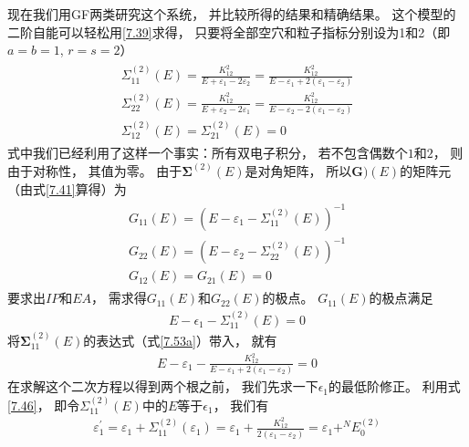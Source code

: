 现在我们用GF两类研究这个系统，
并比较所得的结果和精确结果。
这个模型的二阶自能可以轻松用\eqref{7.39}求得，
只要将全部空穴和粒子指标分别设为1和2（即$a=b=1$, 
$r=s=2$）
\begin{subequations}
    \begin{align}\begin{array}{l}
    \Sigma_{11}^{(2)}(E)=\frac{K_{12}^{2}}{E+\varepsilon_{1}-2 \varepsilon_{2}}=\frac{K_{12}^{2}}{E-\varepsilon_{1}+2\left(\varepsilon_{1}-\varepsilon_{2}\right)} \label{7.53a}\\
    \Sigma_{22}^{(2)}(E)=\frac{K_{12}^{2}}{E+\varepsilon_{2}-2 \varepsilon_{1}}=\frac{K_{12}^{2}}{E-\varepsilon_{2}-2\left(\varepsilon_{1}-\varepsilon_{2}\right)} \\
    \Sigma_{12}^{(2)}(E)=\Sigma_{21}^{(2)}(E)=0
    \end{array}\end{align}
\end{subequations}
式中我们已经利用了这样一个事实：所有双电子积分，
若不包含偶数个$1$和$2$，
则由于对称性，
其值为零。
由于$\mathbf{\Sigma}^{(2)}(E)$是对角矩阵，
所以$\mathbf{G})(E)$的矩阵元（由式\eqref{7.41}算得）为
\begin{subequations}
\begin{align}\begin{array}{l}
G_{11}(E)=\left(E-\varepsilon_{1}-\Sigma_{11}^{(2)}(E)\right)^{-1} \\
G_{22}(E)=\left(E-\varepsilon_{2}-\Sigma_{22}^{(2)}(E)\right)^{-1} \\
G_{12}(E)=G_{21}(E)=0
\end{array}\end{align}
\end{subequations}
要求出$IP$和$EA$，
需求得$G_{11}(E)$和$G_{22}(E)$的极点。
$G_{11}(E)$的极点满足
\begin{align}\label{7.55a}
E - \epsilon_1 - \Sigma_{11}^{(2)}(E) = 0
\end{align}
将$\mathbf{\Sigma}_{11}^{(2)}(E)$的表达式（式\eqref{7.53a}）带入，
就有
\begin{align}\label{7.55b}
    E-\varepsilon_{1}-\frac{K_{12}^{2}}{E-\varepsilon_{1}+2\left(\varepsilon_{1}-\varepsilon_{2}\right)}=0
\end{align}
在求解这个二次方程以得到两个根之前，
我们先求一下$\epsilon_1$的最低阶修正。
利用式\eqref{7.46}，
即令$\Sigma_{11}^{(2)}(E)$中的$E$等于$\epsilon_{1}$，
我们有
\begin{align}
\varepsilon_{1}^{\prime}=\varepsilon_{1}+\Sigma_{11}^{(2)}\left(\varepsilon_{1}\right)=\varepsilon_{1}+\frac{K_{12}^{2}}{2\left(\varepsilon_{1}-\varepsilon_{2}\right)}=\varepsilon_{1}+ ^NE_{0}^{(2)}
\end{align}
